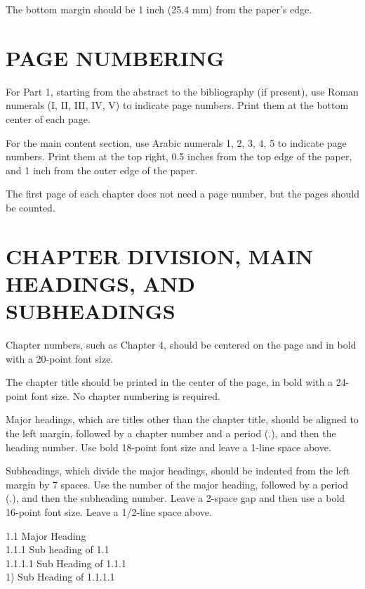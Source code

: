 The bottom margin should be 1 inch (25.4 mm) from the paper's edge.

\section{PAGE NUMBERING}

For Part 1, starting from the abstract to the bibliography (if present), use Roman numerals (I, II, III, IV, V) to indicate page numbers. Print them at the bottom center of each page.

For the main content section, use Arabic numerals 1, 2, 3, 4, 5 to indicate page numbers. Print them at the top right, 0.5 inches from the top edge of the paper, and 1 inch from the outer edge of the paper.

The first page of each chapter does not need a page number, but the pages should be counted.

\section{CHAPTER DIVISION, MAIN HEADINGS, AND SUBHEADINGS}

Chapter numbers, such as Chapter 4, should be centered on the page and in bold with a 20-point font size.

The chapter title should be printed in the center of the page, in bold with a 24-point font size. No chapter numbering is required.

Major headings, which are titles other than the chapter title, should be aligned to the left margin, followed by a chapter number and a period (.), and then the heading number. Use bold 18-point font size and leave a 1-line space above.

Subheadings, which divide the major headings, should be indented from the left margin by 7 spaces. Use the number of the major heading, followed by a period (.), and then the subheading number. Leave a 2-space gap and then use a bold 16-point font size. Leave a 1/2-line space above.

\noindent
\begin{flushleft}
\hspace{7em}1.1 Major Heading \dotfill \\
\hspace{8em}1.1.1 Sub heading of 1.1 \dotfill \\
\hspace{9em}1.1.1.1 Sub Heading of 1.1.1 \dotfill \\
\hspace{10em}1) Sub Heading of 1.1.1.1 \dotfill
\end{flushleft}


